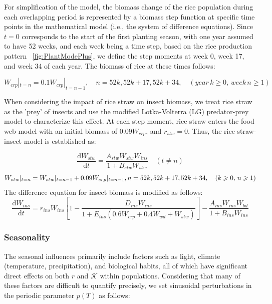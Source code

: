 \documentclass{HZNUMCM}
\begin{document}
        For simplification of the model, 
        the biomass change of the rice population during each overlapping period is represented 
        by a biomass step function at specific time points in the mathematical model (i.e., the system of difference equations). 
        Since $t=0$ corresponds to the start of the first planting season, with one year assumed to have 52 weeks, 
        and each week being a time step, based on the rice production pattern \figurename~\ref{fig:PlantModePlus}, 
        we define the step moments at week 0, week 17, and week 34 of each year. The biomass of rice at these times follows:

        \begin{equation}
        W_{crp}|_{t=n}=0.1W_{crp}|_{t=n-1}, \quad n = 52k, 52k+17, 52k+34, \quad (year\, k \geqslant 0, \, week\, n \geqslant 1)
        \end{equation}

        When considering the impact of rice straw on insect biomass, 
        we treat rice straw as the 'prey' of insects and use the modified Lotka-Volterra (LG) predator-prey model to characterize this effect. 
        At each step moment, rice straw enters the food web model with an initial biomass of $0.09W_{crp}$, and $r_{stw} = 0$. 
        Thus, the rice straw-insect model is established as:

        \begin{equation}
          \frac{\mathrm{d}W_{stw}}{\mathrm{d}t} = \frac{A_{stw} W_{stw} W_{ins}}{1 + B_{stw} W_{stw}} \quad (t \neq n)
        \end{equation}
        \begin{equation}
          W_{stw}|_{t=n} = W_{stw}|_{t=n-1} + 0.09 W_{crp}|_{t=n-1},\\
          n = 52k, 52k+17, 52k+34, \quad (k \geqslant 0, \, n \geqslant 1)
        \end{equation}
        The difference equation for insect biomass is modified as follows:
        \begin{equation}
          \frac{\mathrm{d}W_{ins}}{\mathrm{d}t} = r_{ins} W_{ins} \left[ 1 - \frac{D_{ins} W_{ins}}{1 + E_{ins} \left( 0.6 W_{crp} + 0.4 W_{wd} + W_{stw} \right)} \right] - \frac{A_{ins} W_{ins} W_{bd}}{1 + B_{ins} W_{ins}}
        \end{equation}

      \subsubsection{Seasonality}
        The seasonal influences primarily include factors such as light, 
        climate (temperature, precipitation), and biological habits, 
        all of which have significant direct effects on both $r$ and $\mathscr{K}$ within populations. 
        Considering that many of these factors are difficult to quantify precisely, 
        we set sinusoidal perturbations in the periodic parameter $p(T)$ as follows\cite{GAKKHAR20061239}:
\end{document}
